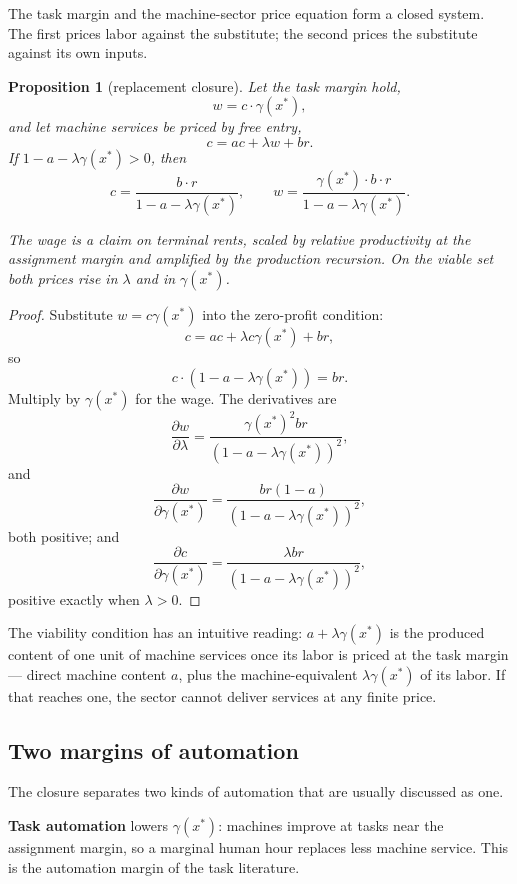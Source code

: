 \documentclass[12pt]{article}
\theoremstyle{plain}
\newtheorem{proposition}{Proposition}
\begin{document}
The task margin and the machine-sector price equation form a closed system. The
first prices labor against the substitute; the second prices the substitute
against its own inputs.

\begin{proposition}[replacement closure]\label{prop:replacement}
Let the task margin hold,
\[
w = c\cdot\gamma(x^*),
\]
and let machine services be priced by free entry,
\[
c = ac + \lambda w + br.
\]
If $1-a-\lambda\gamma(x^*)>0$, then
\begin{equation}\label{eq:closure}
c =
\frac{b\cdot r}{1-a-\lambda\gamma(x^*)},
\qquad
w =
\frac{\gamma(x^*)\cdot b\cdot r}
     {1-a-\lambda\gamma(x^*)}.
\end{equation}

The wage is a claim on terminal rents, scaled by relative productivity at the
assignment margin and amplified by the production recursion. On the viable set
both prices rise in $\lambda$ and in $\gamma(x^*)$.
\end{proposition}

\begin{proof}
Substitute $w=c\gamma(x^*)$ into the zero-profit condition:
\[
c = ac + \lambda c\gamma(x^*) + br,
\]
so
\[
c\cdot(1-a-\lambda\gamma(x^*)) = br.
\]
Multiply by $\gamma(x^*)$ for the wage. The derivatives are
\[
\frac{\partial w}{\partial\lambda}
=
\frac{\gamma(x^*)^2br}
     {(1-a-\lambda\gamma(x^*))^2},
\]
and
\[
\frac{\partial w}{\partial\gamma(x^*)}
=
\frac{br(1-a)}
     {(1-a-\lambda\gamma(x^*))^2},
\]
both positive; and
\[
\frac{\partial c}{\partial\gamma(x^*)}
=
\frac{\lambda br}
     {(1-a-\lambda\gamma(x^*))^2},
\]
positive exactly when $\lambda>0$.
\end{proof}

The viability condition has an intuitive reading:
$a+\lambda\gamma(x^*)$ is the produced content of one unit of machine services
once its labor is priced at the task margin --- direct machine content $a$, plus
the machine-equivalent $\lambda\gamma(x^*)$ of its labor. If that reaches one,
the sector cannot deliver services at any finite price.


\subsection{Two margins of automation}

The closure separates two kinds of automation that are usually discussed as one.

\textbf{Task automation} lowers $\gamma(x^*)$: machines improve at tasks near the
assignment margin, so a marginal human hour replaces less machine service. This
is the automation margin of the task literature.
\end{document}
